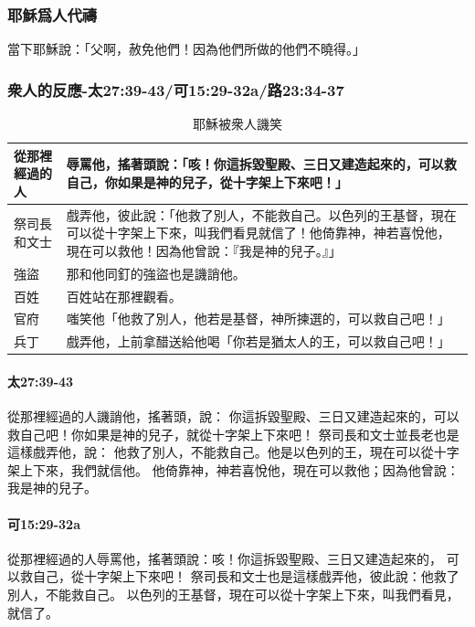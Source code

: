 \subsubsection{耶穌爲人代禱}
當下耶穌說：「父啊，赦免他們！因為他們所做的他們不曉得。」

\subsubsection{衆人的反應-太27:39-43/可15:29-32a/路23:34-37}
\begin{table}[htbp]
  \centering 
    \begin{tabular}{|p{4.225em}|p{35.955em}|}
    \toprule
    從那裡經過的人 & 辱罵他，搖著頭說：「咳！你這拆毀聖殿、三日又建造起來的，可以救自己，你如果是神的兒子，從十字架上下來吧！」 \\
    \midrule
    祭司長和文士 & 戲弄他，彼此說：「他救了別人，不能救自己。以色列的王基督，現在可以從十字架上下來，叫我們看見就信了！他倚靠神，神若喜悅他，現在可以救他！因為他曾說：『我是神的兒子。』」 \\
    \midrule
    強盜    & 那和他同釘的強盜也是譏誚他。 \\
    \midrule
    百姓    & 百姓站在那裡觀看。 \\
    \midrule
    官府    & 嗤笑他「他救了別人，他若是基督，神所揀選的，可以救自己吧！」 \\
    \midrule
    兵丁    & 戲弄他，上前拿醋送給他喝「你若是猶太人的王，可以救自己吧！」 \\
    \bottomrule
    \end{tabular}%
     \caption{耶穌被衆人譏笑}
  \label{tab:addlabel}%
\end{table}

\paragraph{太27:39-43}
從那裡經過的人譏誚他，搖著頭，說：
你這拆毀聖殿、三日又建造起來的，可以救自己吧！你如果是神的兒子，就從十字架上下來吧！
祭司長和文士並長老也是這樣戲弄他，說：
他救了別人，不能救自己。他是以色列的王，現在可以從十字架上下來，我們就信他。
他倚靠神，神若喜悅他，現在可以救他；因為他曾說：我是神的兒子。
\paragraph{可15:29-32a}
從那裡經過的人辱罵他，搖著頭說：咳！你這拆毀聖殿、三日又建造起來的，
可以救自己，從十字架上下來吧！
祭司長和文士也是這樣戲弄他，彼此說：他救了別人，不能救自己。
以色列的王基督，現在可以從十字架上下來，叫我們看見，就信了。
